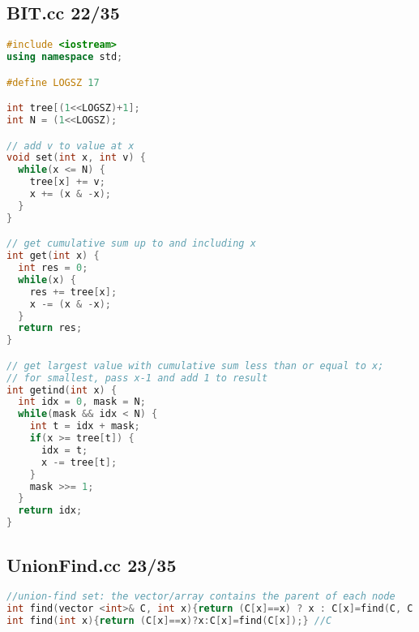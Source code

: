 \subsection{BIT.cc 22/35}
\begin{lstlisting}[language=C++]
#include <iostream>
using namespace std;

#define LOGSZ 17

int tree[(1<<LOGSZ)+1];
int N = (1<<LOGSZ);

// add v to value at x
void set(int x, int v) {
  while(x <= N) {
    tree[x] += v;
    x += (x & -x);
  }
}

// get cumulative sum up to and including x
int get(int x) {
  int res = 0;
  while(x) {
    res += tree[x];
    x -= (x & -x);
  }
  return res;
}

// get largest value with cumulative sum less than or equal to x;
// for smallest, pass x-1 and add 1 to result
int getind(int x) {
  int idx = 0, mask = N;
  while(mask && idx < N) {
    int t = idx + mask;
    if(x >= tree[t]) {
      idx = t;
      x -= tree[t];
    }
    mask >>= 1;
  }
  return idx;
}

\end{lstlisting}
\subsection{UnionFind.cc 23/35}
\begin{lstlisting}[language=C++]
//union-find set: the vector/array contains the parent of each node
int find(vector <int>& C, int x){return (C[x]==x) ? x : C[x]=find(C, C[x]);} //C++
int find(int x){return (C[x]==x)?x:C[x]=find(C[x]);} //C

\end{lstlisting}
